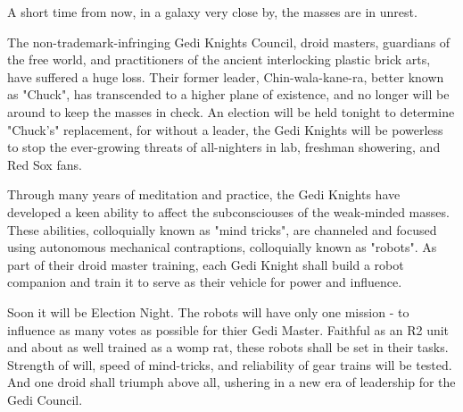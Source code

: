 A short time from now, in a galaxy very close by, the masses are in unrest.

The non-trademark-infringing Gedi Knights Council, droid masters, guardians of the free world, and practitioners of the ancient interlocking plastic brick arts, have suffered a huge loss. Their former leader, Chin-wala-kane-ra, better known as "Chuck", has transcended to a higher plane of existence, and no longer will be around to keep the masses in check. An election will be held tonight to determine "Chuck's" replacement, for without a leader, the Gedi Knights will be powerless to stop the ever-growing threats of all-nighters in lab, freshman showering, and Red Sox fans.

Through many years of meditation and practice, the Gedi Knights have developed a keen ability to affect the subconsciouses of the weak-minded masses. These abilities, colloquially known as "mind tricks", are channeled and focused using autonomous mechanical contraptions, colloquially known as "robots". As part of their droid master training, each Gedi Knight shall build a robot companion and train it to serve as their vehicle for power and influence. 

Soon it will be Election Night. The robots will have only one mission - to influence as many votes as possible for thier Gedi Master. Faithful as an R2 unit and about as well trained as a womp rat, these robots shall be set in their tasks. Strength of will, speed of mind-tricks, and reliability of gear trains will be tested. And one droid shall triumph above all, ushering in a new era of leadership for the Gedi Council.

